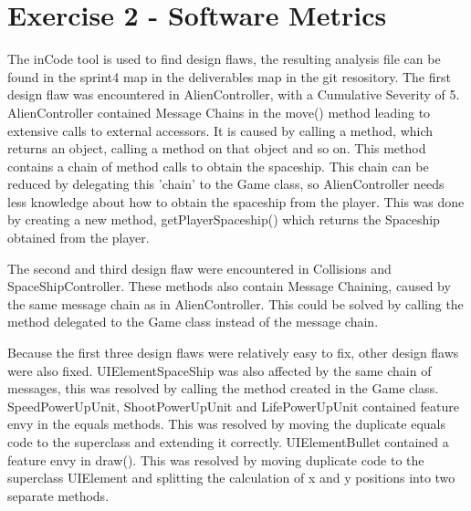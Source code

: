 
\section{Exercise 2 - Software Metrics }
The inCode tool is used to find design flaws, the resulting analysis file can be found in the sprint4 map in the deliverables map in the git resository.
The first design flaw was encountered in AlienController, with a Cumulative Severity of 5. 
AlienController contained Message Chains in the move() method leading to extensive calls to external accessors. It is caused by calling a method, which returns an object, calling a method on that object and so on. This method contains a chain of method calls to obtain the spaceship. This chain can be reduced by delegating this 'chain' to the Game class, so AlienController needs less knowledge about how to obtain the spaceship from the player. This was done by creating a new method, getPlayerSpaceship() which returns the Spaceship obtained from the player.

The second and third design flaw were encountered in Collisions and SpaceShipController. These methods also contain Message Chaining, caused by the same message chain as in AlienController. This could be solved by calling the method delegated to the Game class instead of the message chain.

Because the first three design flaws were relatively easy to fix, other design flaws were also fixed. 
UIElementSpaceShip was also affected by the same chain of messages, this was resolved by calling the method created in the Game class. SpeedPowerUpUnit, ShootPowerUpUnit and LifePowerUpUnit contained feature envy in the equals methods. This was resolved by moving the duplicate equals code to the superclass and extending it correctly. UIElementBullet contained a feature envy in draw(). This was resolved by moving duplicate code to the superclass UIElement and splitting the calculation of x and y positions into two separate methods. 
